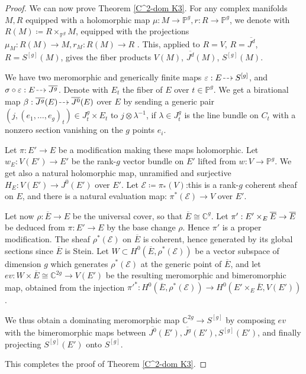 \documentclass[JEP,XML,SOM,Unicode, NoEqCountersInSection,NoFloatCountersInSection,published]{cedram}
\let\mathcal\mathscr
\let\epsilon\varepsilon
\newcommand{\dradpl}{{\hspace*{-2.5mm}\begin{tikzcd}[ampersand replacement=\&,column sep = scriptsize]\mbox{}\ar[r,dashed]\&\mbox{}\end{tikzcd}\hspace*{-2.5mm}}}
\newcommand{\dratst}{{\hspace*{-2.5mm}\begin{tikzcd}[ampersand replacement=\&,column sep = small]\mbox{}\ar[r,dashed]\&\mbox{}\end{tikzcd}\hspace*{-2mm}}}
\let\drascst\dratst
\newcommand{\dra}{\mathchoice{\dradpl}{\dratst}{\drascst}{\drascst}}
\let\dasharrow\dra
\theoremstyle{theorem}
\theoremstyle{definition}
\def\bC{{\mathbb C}}
\def\bP{{\mathbb P}}
\begin{document}
\begin{proof} We can now prove Theorem \ref{C^2-dom K3}. For any complex manifolds $M,R$ equipped with a holomorphic map $\mu:M\to \bP^g, r:R\to \bP^g$, we denote with $R(M)\coloneqq R\times_{\bP^g}M$, equipped with the projections $\mu_M:R(M)\to M, r_M:R(M)\to R$ . This, applied to $R=V$, $R=\overline{J^d}$, $R=S^{[g]}(M)$, gives the fiber products $V(M)$, $\overline{J^d}(M)$, $S^{[g]}(M)$.

We have two meromorphic and generically finite maps $\epsilon: E\dasharrow S^{[g]}$, and $\sigma \circ \epsilon:E\dasharrow \overline{J^g}$. Denote with $E_t$ the fiber of $E$ over $t\in \bP^g$. We get a birational map \hbox{$\beta:\overline{J^g}(E)\dasharrow \overline{J^0}(E)$} over $E$ by sending a generic pair $(j,(e_1,\dots,e_g)_t)\in J_t^g\times E_t$ to $j\otimes \lambda^{-1}$, if $\lambda\in J_t^g$ is the line bundle on $C_t$ with a nonzero section vanishing on the $g$ points $e_i$.

Let $\pi:E'\to E$ be a modification making these maps holomorphic. Let $w_E:V(E')\to E'$ be the rank-$g$ vector bundle on $E'$ lifted from $w:V\to \bP^g$. We get also a natural holomorphic map, unramified and surjective $H_E:V(E')\to J^0(E')$ over $E'$. Let $\mathcal E\coloneqq \pi_*(V)$:this is a rank-$g$ coherent sheaf on $E$, and there is a natural evaluation map: $\pi^*(\mathcal{E})\to V$ over $E'$.

Let now $\rho: \overline{E}\to E$ be the universal cover, so that $\overline{E}\cong \bC^g$. Let $\pi':E'\times_E\nobreak\overline{E}\to \overline{E}$ be deduced from $\pi:E'\to E$ by the base change $\rho$. Hence $\pi'$ is a proper modification. The sheaf $\rho^*(\mathcal{E})$ on $\overline{E}$ is coherent, hence generated by its global sections since $\overline{E}$ is Stein. Let $W\subset H^0(\overline{E},\rho^*(\mathcal{E}))$ be a vector subspace of dimension $g$ which generates $\rho^*(\mathcal{E})$ at the generic point of $\overline{E}$, and let $ev:W\times \overline{E}\cong \bC^{2g}\to V(E')$ be the resulting meromorphic and bimeromorphic map, obtained from the injection $\pi'^*:H^0(\overline{E},\rho^*(\mathcal{E}))\to H^0(E'\times_E\overline{E},V(E'))$.

We thus obtain a dominating meromorphic map $\bC^{2g}\to S^{[g]}$ by composing $ev$ with the bimeromorphic maps between $\overline{J^0}(E'),\overline{J^g}(E'),S^{[g]}(E')$, and finally projecting $S^{[g]}(E')$ onto $S^{[g]}$.

This completes the proof of Theorem \ref{C^2-dom K3}.\end{proof}
\end{document}
